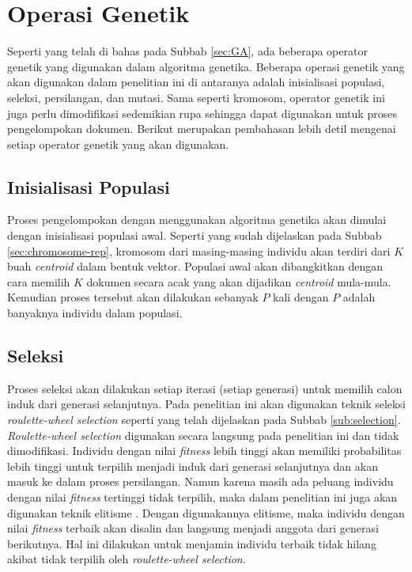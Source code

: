 \section{Operasi Genetik}
Seperti yang telah di bahas pada Subbab \ref{sec:GA}, ada beberapa operator genetik yang digunakan dalam algoritma genetika. Beberapa operasi genetik yang akan digunakan dalam penelitian ini di antaranya adalah inisialisasi populasi, seleksi, persilangan, dan mutasi. Sama seperti kromosom, operator genetik ini juga perlu dimodifikasi sedemikian rupa sehingga dapat digunakan untuk proses pengelompokan dokumen. Berikut merupakan pembahasan lebih detil mengenai setiap operator genetik yang akan digunakan.

\subsection{Inisialisasi Populasi}
Proses pengelompokan dengan menggunakan algoritma genetika akan dimulai dengan inisialisasi populasi awal. Seperti yang sudah dijelaskan pada Subbab \ref{sec:chromosome-rep}, kromosom dari masing-masing individu akan terdiri dari $K$ buah \textit{centroid} dalam bentuk vektor. Populasi awal akan dibangkitkan dengan cara memilih $K$ dokumen secara acak yang akan dijadikan \textit{centroid} mula-mula. Kemudian proses tersebut akan dilakukan sebanyak $P$ kali dengan $P$ adalah banyaknya individu dalam populasi.

\subsection{Seleksi}
Proses seleksi akan dilakukan setiap iterasi (setiap generasi) untuk memilih calon induk dari generasi selanjutnya. Pada penelitian ini akan digunakan teknik seleksi \textit{roulette-wheel selection} seperti yang telah dijelaskan pada Subbab \ref{sub:selection}. \textit{Roulette-wheel selection} digunakan secara langsung pada penelitian ini dan tidak dimodifikasi. Individu dengan nilai \textit{fitness} lebih tinggi akan memiliki probabilitas lebih tinggi untuk terpilih menjadi induk dari generasi selanjutnya dan akan masuk ke dalam proses persilangan. Namun karena masih ada peluang individu dengan nilai \textit{fitness} tertinggi tidak terpilih, maka dalam penelitian ini juga akan digunakan teknik elitisme \cite{ahn2003elitism}. Dengan digunakannya elitisme, maka individu dengan nilai \textit{fitness} terbaik akan disalin dan langsung menjadi anggota dari generasi berikutnya. Hal ini dilakukan untuk menjamin individu terbaik tidak hilang akibat tidak terpilih oleh \textit{roulette-wheel selection}.

